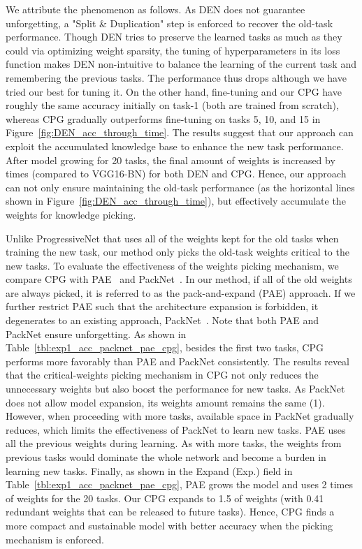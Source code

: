 \documentclass{article}
\begin{document}
We attribute the phenomenon as follows.
As DEN does not guarantee unforgetting, a "Split \& Duplication" step is enforced to recover the old-task performance.
Though DEN tries to preserve the learned tasks as much as they could via optimizing weight sparsity, the tuning of hyperparameters in its loss function makes DEN non-intuitive to balance the learning of the current task and remembering the previous tasks.
The performance thus drops although we have tried our best for tuning it.
On the other hand, fine-tuning and our CPG have roughly the same accuracy initially on task-1 (both are trained from scratch), whereas CPG gradually outperforms fine-tuning on tasks 5, 10, and 15 in Figure~\ref{fig:DEN_acc_through_time}.
The results suggest that our approach can exploit the accumulated knowledge base to enhance the new task performance.
After model growing for 20 tasks, the final amount of weights is increased by  times (compared to VGG16-BN) for both DEN and CPG.
Hence, our approach can not only ensure maintaining the old-task performance (as the horizontal lines shown in Figure~\ref{fig:DEN_acc_through_time}), but effectively accumulate the weights for knowledge picking. 






Unlike ProgressiveNet that uses all of the weights kept for the old tasks when training the new task, our method only picks the old-task weights critical to the new tasks.
To evaluate the effectiveness of the weights picking mechanism, we compare CPG with PAE~\cite{hung2019increasingly} and PackNet~\cite{mallya2018packnet}.
In our method, if all of the old weights are always picked, it is referred to as the pack-and-expand (PAE) approach. 
If we further restrict PAE such that the architecture expansion is forbidden, it degenerates to an existing approach, PackNet~\cite{mallya2018packnet}.
Note that both PAE and PackNet ensure unforgetting.
As shown in Table~\ref{tbl:exp1_acc_packnet_pae_cpg}, besides the first two tasks, CPG performs more favorably than PAE and PackNet consistently.
The results reveal that the critical-weights picking mechanism in CPG not only reduces the unnecessary weights but also boost the performance for new tasks.
As PackNet does not allow model expansion, its weights amount remains the same (1).
However, when proceeding with more tasks, available space in PackNet gradually reduces, which limits the effectiveness of PackNet to learn new tasks.
PAE uses all the previous weights during learning.
As with more tasks, the weights from previous tasks would dominate the whole network and become a burden in learning new tasks. 
Finally, as shown in the Expand (Exp.) field in Table~\ref{tbl:exp1_acc_packnet_pae_cpg}, PAE grows the model and uses 2 times of weights for the 20 tasks.
Our CPG expands to 1.5 of weights (with 0.41 redundant weights that can be released to future tasks).
Hence, CPG finds a more compact and sustainable model with better accuracy when the picking mechanism is enforced.
\end{document}
